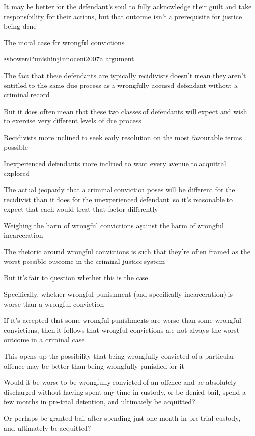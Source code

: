 It may be better for the defendant's soul to fully acknowledge their guilt and take responsibility for their actions, but that outcome isn't a prerequisite for justice being done

The moral case for wrongful convictions

@bowersPunishingInnocent2007a argument

The fact that these defendants are typically recidivists doesn't mean they aren't entitled to the same due process as a wrongfully accused defendant without a criminal record

But it does often mean that these two classes of defendants will expect and wish to exercise very different levels of due process

Recidivists more inclined to seek early resolution on the most favourable terms possible

Inexperienced defendants more inclined to want every avenue to acquittal explored

The actual jeopardy that a criminal conviction poses will be different for the recidivist than it does for the unexperienced defendant, so it's reasonable to expect that each would treat that factor differently

Weighing the harm of wrongful convictions against the harm of wrongful incarceration

The rhetoric around wrongful convictions is such that they're often framed as the worst possible outcome in the criminal justice system

But it's fair to question whether this is the case

Specifically, whether wrongful punishment (and specifically incarceration) is worse than a wrongful conviction

If it's accepted that some wrongful punishments are worse than some wrongful convictions, then it follows that wrongful convictions are not always the worst outcome in a criminal case

This opens up the possibility that being wrongfully convicted of a particular offence may be better than being wrongfully punished for it

Would it be worse to be wrongfully convicted of an offence and be absolutely discharged without having spent any time in custody, or be denied bail, spend a few months in pre-trial detention, and ultimately be acquitted?

Or perhaps be granted bail after spending just one month in pre-trial custody, and ultimately be acquitted?

